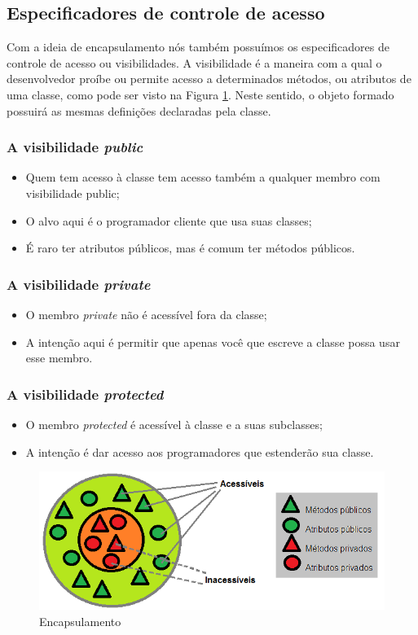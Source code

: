 \subsection{Especificadores de controle de acesso}

Com a ideia de encapsulamento nós também possuímos os especificadores de controle de acesso ou visibilidades. A visibilidade é a maneira com a qual o desenvolvedor proíbe ou permite acesso a determinados métodos, ou atributos de uma classe, como pode ser visto na Figura \ref{fig:encapsulamento}. Neste sentido, o objeto formado possuirá as mesmas definições declaradas pela classe.

\subsubsection{A visibilidade \textit{public}}
\begin{itemize}
  \item Quem tem acesso à classe tem acesso também a qualquer membro com visibilidade public;
  \item O alvo aqui é o programador cliente que usa suas classes;
  \item É raro ter atributos públicos, mas é comum ter métodos públicos.
\end{itemize}

\subsubsection{A visibilidade \textit{private}}
\begin{itemize}
  \item O membro \textit{private} não é acessível fora da classe;
  \item A intenção aqui é permitir que apenas você que escreve a classe possa usar esse membro.
\end{itemize}

\subsubsection{A visibilidade \textit{protected}}
\begin{itemize}
  \item O membro \textit{protected} é acessível à classe e a suas subclasses;
  \item A intenção é dar acesso aos programadores que estenderão sua classe.
\end{itemize}

\begin{figure}[H]
  \centering
  \includegraphics[scale=0.45]{imagens/encapsulamento.png}
  \caption{Encapsulamento}
  \label{fig:encapsulamento}
\end{figure}

